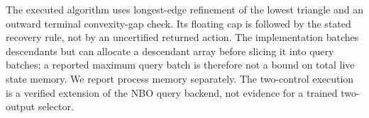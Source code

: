 The executed algorithm uses longest-edge refinement of the lowest triangle and an outward terminal convexity-gap check. Its floating cap is followed by the stated recovery rule, not by an uncertified returned action. The implementation batches descendants but can allocate a descendant array before slicing it into query batches; a reported maximum query batch is therefore not a bound on total live state memory. We report process memory separately. The two-control execution is a verified extension of the NBO query backend, not evidence for a trained two-output selector.

